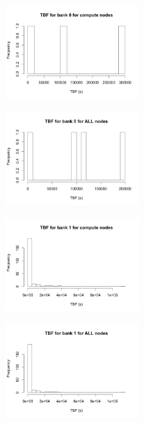 \begin{figure}
\centering
\includegraphics[width=0.45\textwidth]{images/tbf_0_c.png}
\end{figure}

\begin{figure}
\centering
\includegraphics[width=0.45\textwidth]{images/tbf_0_a.png}
\end{figure}

\begin{figure}
\centering
\includegraphics[width=0.45\textwidth]{images/tbf_1_c.png}
\end{figure}

\begin{figure}
\centering
\includegraphics[width=0.45\textwidth]{images/tbf_1_a.png}
\end{figure}

